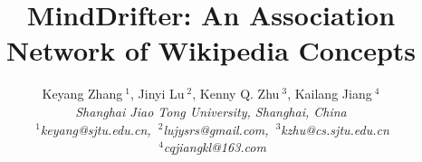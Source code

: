 \documentclass[conference,letterpaper]{IEEEtran}
\begin{document}
\title{MindDrifter: An Association Network of Wikipedia Concepts}
\author{
{Keyang Zhang{\small $~^{1}$}, Jinyi Lu{\small $~^{2}$}, 
Kenny Q. Zhu{\small $~^{3}$}, Kailang Jiang{\small $~^{4}$}}%
\vspace{1.6mm}\\
\fontsize{10}{10}\selectfont\itshape
Shanghai Jiao Tong University, Shanghai, China\\
\fontsize{9}{9}\selectfont\ttfamily\upshape
$~^{1}$keyang@sjtu.edu.cn, $~^{2}$lujysrs@gmail.com, $~^{3}$kzhu@cs.sjtu.edu.cn \\
$~^{4}$cqjiangkl@163.com\\
}
\maketitle
\end{document}

